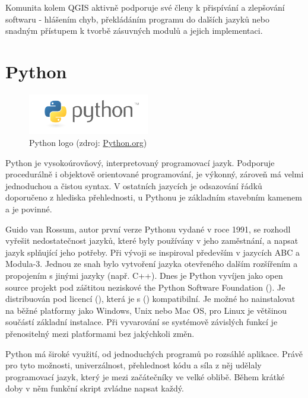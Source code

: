 Komunita kolem QGIS aktivně podporuje své členy k přispívání a zlepšování softwaru - hlášením chyb, překládáním programu do dalších jazyků nebo snadným přístupem k tvorbě zásuvných modulů a jejich implementaci. 


\section{Python}

\begin{figure}[H]
    \centering
      \includegraphics[width=150pt]{./pictures/python-logo-master-v3-TM.png}
      \caption[Python logo]{Python logo 
      (zdroj: \href{https://www.python.org/static/community_logos/python-logo-master-v3-TM.png}{Python.org})}
      \label{fig:python}
  \end{figure}
  
Python je vysokoúrovňový, interpretovaný programovací jazyk. Podporuje procedurálně i objektově orientované programování, je výkonný, zároveň má velmi jednoduchou a čistou syntax. V ostatních jazycích je odsazování řádků doporučeno z hlediska přehlednosti, u Pythonu je základním stavebním kamenem a je povinné. 

Guido van Rossum, autor první verze Pythonu vydané v roce 1991, se rozhodl vyřešit nedostatečnost jazyků, které byly používány v jeho zaměstnání, a napsat jazyk splňující jeho potřeby. Při vývoji se inspiroval především v jazycích ABC a Modula-3. Jednou ze snah bylo vytvoření jazyka otevřeného dalším rozšířením a propojením s jinými jazyky (např. C++). Dnes je Python vyvíjen jako open source projekt pod záštitou neziskové the Python Software Foundation (). Je distribuován pod licencí (), která je s () kompatibilní. Je možné ho nainstalovat na běžné platformy jako Windows, Unix nebo Mac OS, pro Linux je většinou součástí základní instalace. Při vyvarování se systémově závislých funkcí je přenositelný mezi platformami bez jakýchkoli změn.

Python má široké využití, od jednoduchých programů po rozsáhlé aplikace. Právě pro tyto možnosti, univerzálnost, přehlednost kódu a síla z něj udělaly programovací jazyk, který je mezi začátečníky ve velké oblibě. Během krátké doby v něm funkční skript zvládne napsat každý. 
  
